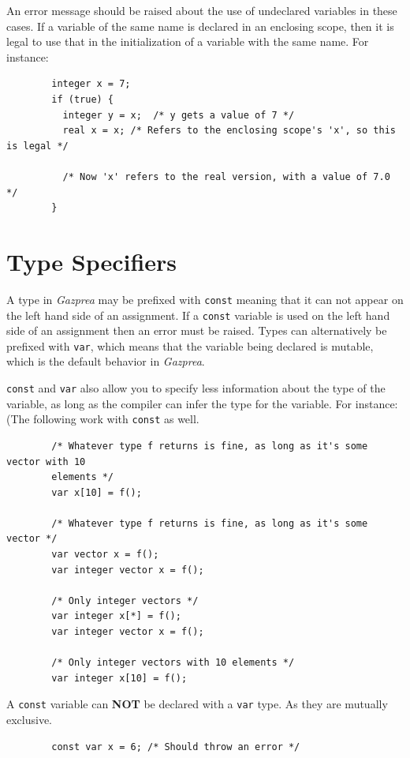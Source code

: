 \documentclass{article}
\begin{document}
	An error message should be raised about the use of undeclared variables in these cases. If a variable of the same
	name is declared in an enclosing scope, then it is legal to use that in the initialization of a variable with the
	same name. For instance:

	\begin{lstlisting}
		integer x = 7;
		if (true) {
		  integer y = x;  /* y gets a value of 7 */
		  real x = x; /* Refers to the enclosing scope's 'x', so this is legal */

		  /* Now 'x' refers to the real version, with a value of 7.0 */
		}
	\end{lstlisting}


\section{Type Specifiers}\label{sec:typeSpecifiers}
	A type in \textit{Gazprea} may be prefixed with \texttt{const} meaning that it can not appear on the left hand side
	of an assignment. If a \texttt{const} variable is used on the left hand side of an assignment then an error must be
	raised. Types can alternatively be prefixed with \texttt{var}, which means that the variable being declared is
	mutable, which is the default behavior in \textit{Gazprea}.

	\texttt{const} and \texttt{var} also allow you to specify less information about the type of the variable, as long
	as the compiler can infer the type for the variable. For instance: (The following work with \texttt{const} as well.

	\begin{lstlisting}
		/* Whatever type f returns is fine, as long as it's some vector with 10
		elements */
		var x[10] = f();

		/* Whatever type f returns is fine, as long as it's some vector */
		var vector x = f();
		var integer vector x = f();

		/* Only integer vectors */
		var integer x[*] = f();
		var integer vector x = f();

		/* Only integer vectors with 10 elements */
		var integer x[10] = f();
	\end{lstlisting}

	A \texttt{const} variable can \textbf{NOT} be declared with a \texttt{var} type. As they are mutually exclusive.

	\begin{lstlisting}
		const var x = 6; /* Should throw an error */
	\end{lstlisting}
\end{document}
